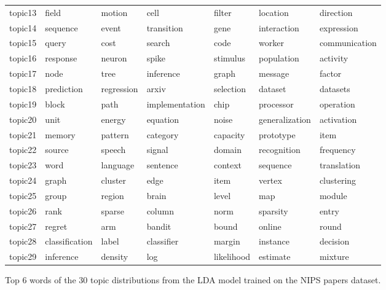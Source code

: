 \documentclass[letterpaper]{article}
\begin{document}
\begin{figure}[ht]
\begin{tabular}{l | l l l l l l}
    topic13 & field & motion & cell & filter & location & direction \\
    topic14 & sequence & event & transition & gene & interaction & expression \\
    topic15 & query & cost & search & code & worker & communication \\
    topic16 & response & neuron & spike & stimulus & population & activity \\
    topic17 & node & tree & inference & graph & message & factor \\
    topic18 & prediction & regression & arxiv & selection & dataset & datasets \\
    topic19 & block & path & implementation & chip & processor & operation \\
    topic20 & unit & energy & equation & noise & generalization & activation \\
    topic21 & memory & pattern & category & capacity & prototype & item \\
    topic22 & source & speech & signal & domain & recognition & frequency \\
    topic23 & word & language & sentence & context & sequence & translation \\
    topic24 & graph & cluster & edge & item & vertex & clustering \\
    topic25 & group & region & brain & level & map & module \\
    topic26 & rank & sparse & column & norm & sparsity & entry \\
    topic27 & regret & arm & bandit & bound & online & round \\
    topic28 & classification & label & classifier & margin & instance & decision \\
    topic29 & inference & density & log & likelihood & estimate & mixture \\
  \end{tabular}
  \caption{\label{fig:lda_results} Top 6 words of the 30 topic distributions from the LDA model trained on the NIPS papers dataset.}
\end{figure}
\end{document}
